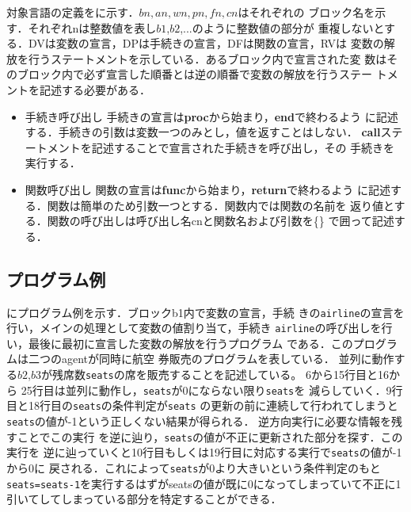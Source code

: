 \documentclass[submit,PRO]{ipsj}
\begin{document}
対象言語の定義をに示す．$bn,an,wn,pn,fn,cn$はそれぞれの
ブロック名を示す．それぞれnは整数値を表し$b1$,$b2$,...のように整数値の部分が
重複しないとする．DVは変数の宣言，DPは手続きの宣言，DFは関数の宣言，RVは
変数の解放を行うステートメントを示している．あるブロック内で宣言された変
数はそのブロック内で必ず宣言した順番とは逆の順番で変数の解放を行うステー
トメントを記述する必要がある．

\begin{itemize}
\item
手続き呼び出し 手続きの宣言は{\bf proc}から始まり，{\bf end}で終わるよう
     に記述する．手続きの引数は変数一つのみとし，値を返すことはしない．
     {\bf call}ステートメントを記述することで宣言された手続きを呼び出し，その
     手続きを実行する．
\item
関数呼び出し 関数の宣言は{\bf func}から始まり，{\bf return}で終わるよう
     に記述する．関数は簡単のため引数一つとする．関数内では関数の名前を
     返り値とする．関数の呼び出しは呼び出し名cnと関数名および引数を\{\}
     で囲って記述する．
\end{itemize}

\subsection{プログラム例}

にプログラム例を示す．ブロックb1内で変数の宣言，手続
きの\verb:airline:の宣言を行い，メインの処理として変数の値割り当て，手続き
\verb:airline:の呼び出しを行い，最後に最初に宣言した変数の解放を行うプログラム
である．このプログラムは二つのagentが同時に航空
券販売のプログラムを表している．
並列に動作する$b2$,$b3$が残席数\verb:seats:の席を販売することを記述している。
6から15行目と16から
25行目は並列に動作し，\verb;seats;が0にならない限り\verb;seats;を
減らしていく．9行目と18行目の\verb;seats;の条件判定が\verb;seats;
の更新の前に連続して行われてしまうと
\verb;seats;の値が-1という正しくない結果が得られる．
逆方向実行に必要な情報を残すことでこの実行
を逆に辿り，\verb;seats;の値が不正に更新された部分を探す．この実行を
逆に辿っていくと10行目もしくは19行目に対応する実行で\verb;seats;の値が-1から0に
戻される．これによって\verb;seats;が0より大きいという条件判定のもと
\verb;seats=seats-1;を実行するはずがseatsの値が既に0になってしまっていて不正に1
引いてしてしまっている部分を特定することができる．
\end{document}
